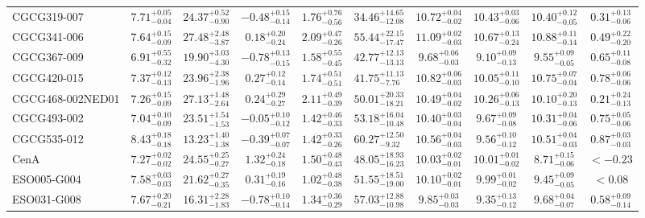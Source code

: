 \documentclass[onecolumn]{mn2e}
\begin{document}
\begin{landscape}
{\begin{center}
\begin{longtable}{lccccccccc}
CGCG319-007 & $7.71_{-0.04}^{+0.05}$ & $24.37_{-0.90}^{+0.52}$ & $-0.48_{-0.14}^{+0.15}$ & $1.76_{-0.56}^{+0.76}$ &$34.46_{-12.08}^{+14.65}$ & $10.72_{-0.02}^{+0.04}$ & $10.43_{-0.06}^{+0.03}$ & $10.40_{-0.05}^{+0.12}$ & $0.31_{-0.06}^{+0.13}$ \\
CGCG341-006 & $7.64_{-0.09}^{+0.15}$ & $27.48_{-3.87}^{+2.48}$ & $0.18_{-0.24}^{+0.20}$ & $2.09_{-0.26}^{+0.47}$ &$55.44_{-17.47}^{+22.15}$ & $11.09_{-0.03}^{+0.02}$ & $10.67_{-0.24}^{+0.13}$ & $10.88_{-0.14}^{+0.11}$ & $0.49_{-0.20}^{+0.22}$ \\
CGCG367-009 & $6.91_{-0.32}^{+0.55}$ & $19.90_{-4.30}^{+3.03}$ & $-0.78_{-0.15}^{+0.13}$ & $1.58_{-0.45}^{+0.55}$ &$42.77_{-13.13}^{+12.13}$ & $9.68_{-0.03}^{+0.06}$ & $9.10_{-0.13}^{+0.09}$ & $9.55_{-0.05}^{+0.09}$ & $0.65_{-0.08}^{+0.11}$ \\
CGCG420-015 & $7.37_{-0.13}^{+0.12}$ & $23.96_{-1.96}^{+2.38}$ & $0.27_{-0.14}^{+0.12}$ & $1.74_{-0.51}^{+0.51}$ &$41.75_{-7.76}^{+11.13}$ & $10.82_{-0.03}^{+0.06}$ & $10.05_{-0.10}^{+0.11}$ & $10.75_{-0.04}^{+0.07}$ & $0.78_{-0.06}^{+0.06}$ \\
CGCG468-002NED01 & $7.26_{-0.09}^{+0.15}$ & $27.13_{-2.64}^{+1.48}$ & $0.24_{-0.27}^{+0.29}$ & $2.11_{-0.39}^{+0.49}$ &$50.01_{-18.21}^{+20.33}$ & $10.49_{-0.02}^{+0.04}$ & $10.26_{-0.13}^{+0.06}$ & $10.10_{-0.13}^{+0.20}$ & $0.21_{-0.13}^{+0.24}$ \\
CGCG493-002 & $7.04_{-0.09}^{+0.10}$ & $23.51_{-1.53}^{+1.54}$ & $-0.05_{-0.12}^{+0.10}$ & $1.42_{-0.33}^{+0.46}$ &$53.18_{-10.48}^{+16.04}$ & $10.40_{-0.04}^{+0.03}$ & $9.67_{-0.08}^{+0.09}$ & $10.31_{-0.06}^{+0.04}$ & $0.75_{-0.06}^{+0.05}$ \\
CGCG535-012 & $8.43_{-0.18}^{+0.18}$ & $13.23_{-1.38}^{+1.40}$ & $-0.39_{-0.07}^{+0.07}$ & $1.42_{-0.26}^{+0.33}$ &$60.27_{-9.32}^{+12.50}$ & $10.56_{-0.03}^{+0.04}$ & $9.56_{-0.12}^{+0.10}$ & $10.51_{-0.03}^{+0.04}$ & $0.87_{-0.03}^{+0.03}$ \\
CenA & $7.27_{-0.02}^{+0.02}$ & $24.55_{-0.27}^{+0.25}$ & $1.32_{-0.18}^{+0.24}$ & $1.50_{-0.43}^{+0.48}$ &$48.05_{-16.23}^{+18.93}$ & $10.03_{-0.01}^{+0.02}$ & $10.01_{-0.02}^{+0.01}$ & $8.71_{-0.06}^{+0.15}$ & $<-0.23$ \\
ESO005-G004 & $7.58_{-0.03}^{+0.03}$ & $21.62_{-0.35}^{+0.27}$ & $0.31_{-0.16}^{+0.19}$ & $1.02_{-0.38}^{+0.48}$ &$51.55_{-19.00}^{+18.51}$ & $10.10_{-0.01}^{+0.02}$ & $9.99_{-0.02}^{+0.01}$ & $9.45_{-0.05}^{+0.09}$ & $<0.08$ \\
ESO031-G008 & $7.67_{-0.21}^{+0.20}$ & $16.31_{-1.83}^{+2.28}$ & $-0.78_{-0.14}^{+0.10}$ & $1.34_{-0.29}^{+0.36}$ &$57.03_{-10.98}^{+12.88}$ & $9.85_{-0.03}^{+0.03}$ & $9.35_{-0.12}^{+0.13}$ & $9.68_{-0.07}^{+0.04}$ & $0.58_{-0.14}^{+0.09}$ \\

\end{longtable}
\end{center}}
\end{landscape}
\end{document}
